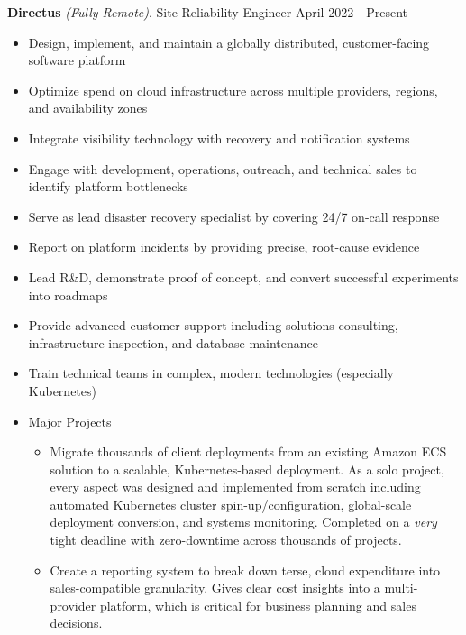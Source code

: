\documentclass[letterpaper,11pt]{article}
\begin{document}
\textbf{Directus} \textit{(Fully Remote)}. Site Reliability Engineer \hfill April 2022 - Present
\begin{itemize}[noitemsep,topsep=0pt]
	\item Design, implement, and maintain a globally distributed, customer-facing software platform
	\item Optimize spend on cloud infrastructure across multiple providers, regions, and availability zones
	\item Integrate visibility technology with recovery and notification systems
	\item Engage with development, operations, outreach, and technical sales to identify platform bottlenecks
	\item Serve as lead disaster recovery specialist by covering 24/7 on-call response
	\item Report on platform incidents by providing precise, root-cause evidence
	\item Lead R\&D, demonstrate proof of concept, and convert successful experiments into roadmaps
	\item Provide advanced customer support including solutions consulting, infrastructure inspection, and database maintenance
	\item Train technical teams in complex, modern technologies (especially Kubernetes)
	\item Major Projects \begin{itemize}[noitemsep, topsep=0pt]
		\item Migrate thousands of client deployments from an existing Amazon ECS solution to a scalable, Kubernetes-based deployment. As a solo project, every aspect was designed and implemented from scratch including automated Kubernetes cluster spin-up/configuration, global-scale deployment conversion, and systems monitoring. Completed on a \textit{very} tight deadline with zero-downtime across thousands of projects.
		\item Create a reporting system to break down terse, cloud expenditure into sales-compatible granularity. Gives clear cost insights into a multi-provider platform, which is critical for business planning and sales decisions.\\
	\end{itemize}
\end{itemize}
\end{document}
